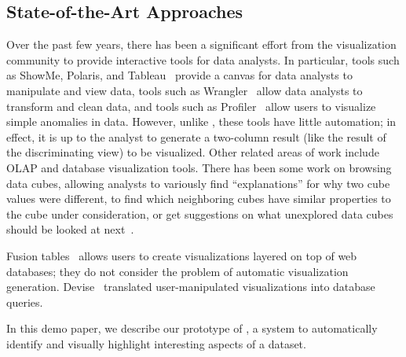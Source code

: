 \subsection{State-of-the-Art Approaches}
\label{related_work}

Over the past few years, there has been a significant
effort from the visualization community to provide interactive tools
for data analysts. In particular, tools such as ShowMe, Polaris, and
Tableau~\cite{DBLP:journals/cacm/StolteTH08,
  DBLP:journals/tvcg/MackinlayHS07} provide a canvas for data analysts
to manipulate and view data, tools such as
Wrangler~\cite{DBLP:conf/chi/KandelPHH11} allow data analysts to
transform and clean data, and tools such as
Profiler~\cite{DBLP:conf/avi/KandelPPHH12} allow users to visualize
simple anomalies in data.  However, unlike \SeeDB, these tools have
little automation; in effect, it is up to the analyst to generate a
two-column result (like the result of the discriminating view)
to be visualized. Other related areas of work include OLAP and database
visualization tools. There has been some work on browsing data cubes, allowing
analysts to variously find ``explanations'' for why two cube values were
different, to find which neighboring cubes have similar properties to the cube
under consideration, or get suggestions on what unexplored data cubes should be
looked at next~\cite{DBLP:conf/vldb/Sarawagi99, DBLP:conf/vldb/SatheS01,
DBLP:conf/vldb/Sarawagi00}.

Fusion tables~\cite{DBLP:conf/sigmod/GonzalezHJLMSSG10} allows users to create
visualizations layered on top of web databases; they do not consider the problem
of automatic visualization generation.
Devise~\cite{DBLP:conf/sigmod/LivnyRBCDLMW97} translated user-manipulated
visualizations into database queries.

In this demo paper, we describe our prototype of \SeeDB, a system to
automatically identify and visually highlight interesting aspects of a dataset. 